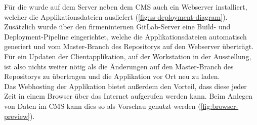 Für die \shst{} wurde auf dem Server neben dem CMS auch ein Webserver installiert, welcher die 
Applikationsdateien ausliefert (\autoref{fig:ss-deployment-diagram}). Zusätzlich wurde über den 
firmeninternen GitLab-Server \cite{gitlab} eine Build- und Deployment-Pipeline eingerichtet, welche die 
Applikationsdateien automatisch generiert und vom Master-Branch des Repositorys auf den Webserver überträgt. 
Für ein Updaten der Clientapplikation, auf der Workstation in der Ausstellung, ist also nichts weiter 
nötig als die Änderungen auf den Master-Branch des Repositorys zu übertragen und die Applikation vor
Ort neu zu laden.\\
Das Webhosting der Applikation bietet außerdem den Vorteil, dass diese jeder Zeit in einem Browser 
über das Internet aufgerufen werden kann. Beim Anlegen von Daten im CMS kann dies so als
Vorschau genutzt werden (\autoref{fig:browser-preview}). 